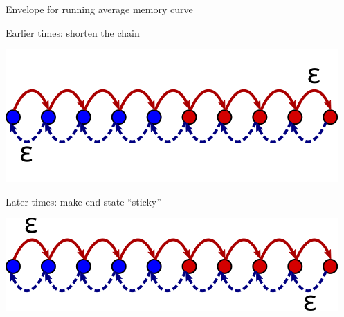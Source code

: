 \documentclass[final,hyperref={pdfpagelabels=false,bookmarks=false}]{beamer}
\begin{document}
\begin{frame}{}
\begin{columns}[t]
\begin{column}{0.33\linewidth}
\begin{block}{Envelope for running average memory curve}
\vp
\parbox[c]{0.45\linewidth}{
 \begin{center}
 \end{center}
}
\hspace{0.5cm}
\parbox[c]{0.45\linewidth}{
   Earlier times: shorten the chain
   \begin{center}
     \includegraphics[width=0.7\linewidth]{multistate_shorten.svg}
   \end{center}

   \vp Later times: make end state ``sticky''
   \begin{center}
     \includegraphics[width=0.7\linewidth]{multistate_sticky.svg}
   \end{center}
}
%
\end{block}


\end{column}
\end{columns}
\end{frame}
\end{document}
